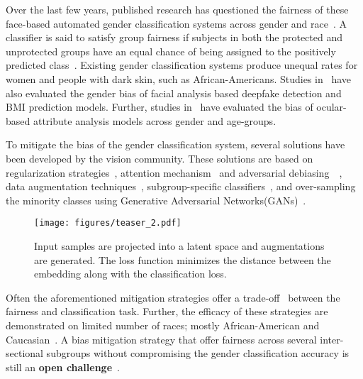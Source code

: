 \documentclass[runningheads]{llncs}
\begin{document}
Over the last few years, published research has questioned the fairness of these face-based automated gender classification systems across gender and race~\cite{gender_shades,commercial_bias,bias_color,bias_fairface}.  A classifier is said to satisfy group fairness if subjects in both the protected and unprotected groups have an equal chance of being assigned to the positively predicted class~\cite{10.1145/3194770.3194776}. Existing gender classification systems produce unequal rates for women and people with dark skin, such as African-Americans. Studies in~\cite{BiasDeep,Siddiqui_2022_CVPR} have also evaluated the gender bias of facial analysis based deepfake detection and BMI prediction models. Further, studies in~\cite{10.1007/978-3-030-68793-9_16,9717383} have evaluated the bias of ocular-based attribute analysis models across gender and age-groups.

To mitigate the bias of the gender classification system, several solutions have been developed by the vision community. These solutions are based on regularization strategies~\cite{readme}, attention mechanism~\cite{att_aware_debias} and adversarial debiasing~~\cite{tradeoff1,tradeoff2}, data augmentation techniques~\cite{fair_mixup}, subgroup-specific classifiers~\cite{multitask}, and over-sampling the minority classes using Generative Adversarial Networks(GANs)~\cite{gan_debias}. 

\begin{figure}[!ht]
    \centering
    \texttt{[image: figures/teaser\_2.pdf]}
    \caption{Input samples are projected into a latent space and augmentations are generated. The loss function minimizes the distance between the embedding along with the classification loss.}
    \label{fig:teaser}
    \vspace{-1.5em}
\end{figure}

Often the aforementioned mitigation strategies offer a trade-off~\cite{tradeoff1,tradeoff2} between the fairness and classification task. Further, the efficacy of these strategies are demonstrated on limited number of races; mostly African-American and Caucasian~\cite{gender_shades,bias_color}. A bias mitigation strategy that offer fairness across several inter-sectional subgroups without compromising the gender classification accuracy is still an \textbf{open challenge}~\cite{chlng}.
\end{document}
